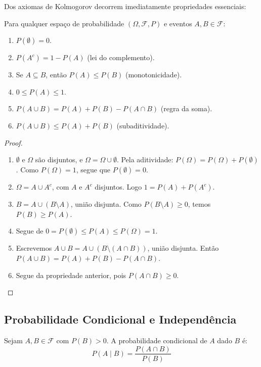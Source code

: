\documentclass{tufte-handout}
\begin{document}
Dos axiomas de Kolmogorov decorrem imediatamente propriedades essenciais:

\begin{prop}
    Para qualquer espaço de probabilidade $(\Omega, \mathcal{F}, P)$ e eventos $A, B \in \mathcal{F}$:
    \begin{enumerate}
        \item $P(\emptyset) = 0$.
        \item $P(A^c) = 1 - P(A)$ (lei do complemento).
        \item Se $A \subseteq B$, então $P(A) \le P(B)$ (monotonicidade).
        \item $0 \le P(A) \le 1$.
        \item $P(A \cup B) = P(A) + P(B) - P(A \cap B)$ (regra da soma).
        \item $P(A \cup B) \le P(A) + P(B)$ (subaditividade).
    \end{enumerate}
\end{prop}

\begin{proof}
    \hfill
    \begin{enumerate}
        \item $\emptyset$ e $\Omega$ são disjuntos, e $\Omega = \Omega \cup \emptyset$.
        Pela aditividade: $P(\Omega) = P(\Omega) + P(\emptyset)$. Como $P(\Omega)=1$, segue que $P(\emptyset)=0$.
        \item $\Omega = A \cup A^c$, com $A$ e $A^c$ disjuntos. Logo $1 = P(A) + P(A^c)$.
        \item $B = A \cup (B \setminus A)$, união disjunta. Como $P(B \setminus A) \ge 0$, temos $P(B) \ge P(A)$.
        \item Segue de $0 = P(\emptyset) \le P(A) \le P(\Omega) = 1$.
        \item Escrevemos $A \cup B = A \cup (B \setminus (A \cap B))$, união disjunta.
        Então $P(A \cup B) = P(A) + P(B) - P(A \cap B)$.
        \item Segue da propriedade anterior, pois $P(A \cap B) \ge 0$.
    \end{enumerate}
\end{proof}

\subsection{Probabilidade Condicional e Independência}

\begin{defn}
    Sejam $A, B \in \mathcal{F}$ com $P(B) > 0$. A probabilidade condicional de $A$ dado $B$ é:
    \[
    P(A \mid B) = \frac{P(A \cap B)}{P(B)}
    \]
\end{defn}
\end{document}
